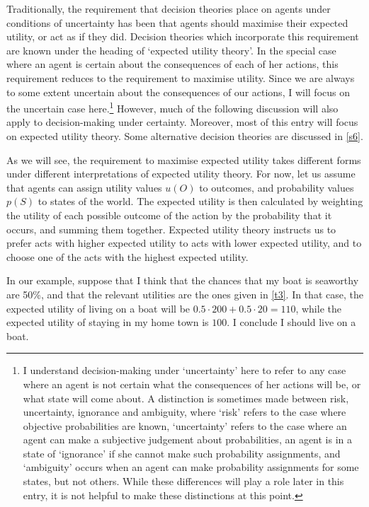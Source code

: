 Traditionally, the requirement that decision theories place on agents under conditions of uncertainty has been that agents should maximise their expected utility, or act as if they did. Decision theories which incorporate this requirement are known under the heading of `expected utility theory'. In the special case where an agent is certain about the consequences of each of her actions, this requirement reduces to the requirement to maximise utility. Since we are always to some extent uncertain about the consequences of our actions, I will focus on the uncertain case here.\footnote{I understand decision-making under `uncertainty' here to refer to any case where an agent is not certain what the consequences of her actions will be, or what state will come about. A distinction is sometimes made between risk, uncertainty, ignorance and ambiguity, where `risk' refers to the case where objective probabilities are known, `uncertainty' refers to the case where an agent can make a subjective judgement about probabilities, an agent is in a state of `ignorance' if she cannot make such probability assignments, and `ambiguity' occurs when an agent can make probability assignments for some states, but not others. While these differences will play a role later in this entry, it is not helpful to make these distinctions at this point.} However, much of the following discussion will also apply to decision-making under certainty. Moreover, most of this entry will focus on expected utility theory. Some alternative decision theories are discussed in \autoref{s6}.

As we will see, the requirement to maximise expected utility takes different forms under different interpretations of expected utility theory. For now, let us assume that agents can assign utility values $u(O)$ to outcomes, and probability values $p(S)$ to states of the world. The expected utility is then calculated by weighting the utility of each possible outcome of the action by the probability that it occurs, and summing them together. Expected utility theory instructs us to prefer acts with higher expected utility to acts with lower expected utility, and to choose one of the acts with the highest expected utility.

In our example, suppose that I think that the chances that my boat is seaworthy are 50\%, and that the relevant utilities are the ones given in \autoref{t3}. In that case, the expected utility of living on a boat will be $0.5 \cdot 200 + 0.5 \cdot 20 = 110$, while the expected utility of staying in my home town is $100$. I conclude I should live on a boat.

